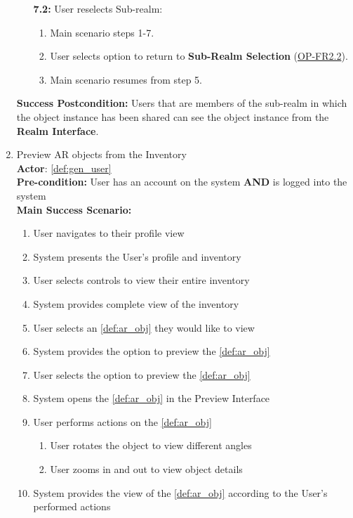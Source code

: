 \documentclass{article}
\begin{document}
\begin{enumerate}[label=\textbf{UC\arabic*}]
\begin{itemize}
              \item[{\bf 7.2:}] User reselects Sub-realm:
                    \begin{enumerate}[label=\textbf{\arabic*.}]
                        \item Main scenario steps 1-7.
                        \item User selects option to return to \textbf{Sub-Realm Selection} (\hyperref[ssub:object_placement]{OP-FR2.2}).
                        \item Main scenario resumes from step 5.
                    \end{enumerate}
          \end{itemize}

          \textbf{Success Postcondition:} Users that are members of the sub-realm in which the object instance has been shared can see the object instance from the \textbf{Realm Interface}.

    \item \label{uc:9} Preview AR objects from the Inventory \\
          \textbf{Actor}: \ref{def:gen_user} \\
          \textbf{Pre-condition:} User has an account on the system \textbf{AND} is logged into the system \\

          \textbf{Main Success Scenario:}
          \begin{enumerate}[label=\textbf{\arabic*.}]
              \item User navigates to their profile view
              \item System presents the User's profile and inventory
              \item User selects controls to view their entire inventory
              \item System provides complete view of the inventory
              \item User selects an \ref{def:ar_obj} they would like to view
              \item System provides the option to preview the \ref{def:ar_obj}
              \item User selects the option to preview the \ref{def:ar_obj}
              \item System opens the \ref{def:ar_obj} in the Preview Interface
              \item User performs actions on the \ref{def:ar_obj}
                    \begin{enumerate}[label=(\alph*)]
                        \item User rotates the object to view different angles
                        \item User zooms in and out to view object details
                    \end{enumerate}
              \item System provides the view of the \ref{def:ar_obj} according to the User's performed actions
          \end{enumerate}


\end{enumerate}
\end{document}
